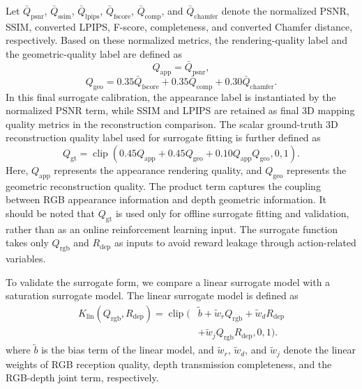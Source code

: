 \documentclass[journal]{IEEEtran}
\begin{document}
Let $\bar{Q}_{\mathrm{psnr}}$, $\bar{Q}_{\mathrm{ssim}}$, $\bar{Q}_{\mathrm{lpips}}$, $\bar{Q}_{\mathrm{fscore}}$, $\bar{Q}_{\mathrm{comp}}$, and $\bar{Q}_{\mathrm{chamfer}}$ denote the normalized PSNR, SSIM, converted LPIPS, F-score, completeness, and converted Chamfer distance, respectively. Based on these normalized metrics, the rendering-quality label and the geometric-quality label are defined as
\begin{equation}
Q_{\mathrm{app}}
=
\bar{Q}_{\mathrm{psnr}},
\end{equation}
\begin{equation}
Q_{\mathrm{geo}}
=
0.35\bar{Q}_{\mathrm{fscore}}
+
0.35\bar{Q}_{\mathrm{comp}}
+
0.30\bar{Q}_{\mathrm{chamfer}}.
\end{equation}
In this final surrogate calibration, the appearance label is instantiated by the normalized PSNR term, while SSIM and LPIPS are retained as final 3D mapping quality metrics in the reconstruction comparison. The scalar ground-truth 3D reconstruction quality label used for surrogate fitting is further defined as
\begin{equation}
Q_{\mathrm{gt}}
=
\operatorname{clip}
\left(
0.45Q_{\mathrm{app}}
+
0.45Q_{\mathrm{geo}}
+
0.10Q_{\mathrm{app}}Q_{\mathrm{geo}},
0,
1
\right).
\end{equation}
Here, $Q_{\mathrm{app}}$ represents the appearance rendering quality, and $Q_{\mathrm{geo}}$ represents the geometric reconstruction quality. The product term captures the coupling between RGB appearance information and depth geometric information. It should be noted that $Q_{\mathrm{gt}}$ is used only for offline surrogate fitting and validation, rather than as an online reinforcement learning input. The surrogate function takes only $Q_{\mathrm{rgb}}$ and $R_{\mathrm{dep}}$ as inputs to avoid reward leakage through action-related variables.

To validate the surrogate form, we compare a linear surrogate model with a saturation surrogate model. The linear surrogate model is defined as
\begin{equation}
\begin{aligned}
K_{\mathrm{lin}}
\left(
Q_{\mathrm{rgb}},
R_{\mathrm{dep}}
\right)
=
\operatorname{clip}
\Big(
&\tilde{b}
+
\tilde{w}_{r}Q_{\mathrm{rgb}}
+
\tilde{w}_{d}R_{\mathrm{dep}}
\\
&+
\tilde{w}_{j}Q_{\mathrm{rgb}}R_{\mathrm{dep}},
0,
1
\Big).
\end{aligned}
\label{eq:linear_surrogate}
\end{equation}
where $\tilde{b}$ is the bias term of the linear model, and $\tilde{w}_{r}$, $\tilde{w}_{d}$, and $\tilde{w}_{j}$ denote the linear weights of RGB reception quality, depth transmission completeness, and the RGB-depth joint term, respectively.
\end{document}
